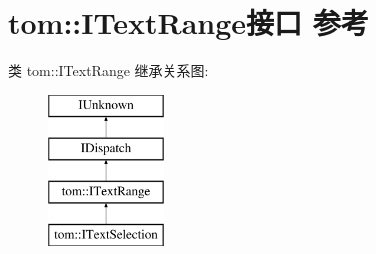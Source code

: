 \hypertarget{interfacetom_1_1_i_text_range}{}\section{tom\+:\+:I\+Text\+Range接口 参考}
\label{interfacetom_1_1_i_text_range}
类 tom\+:\+:I\+Text\+Range 继承关系图\+:\begin{figure}[H]
\begin{center}
\leavevmode
\includegraphics[height=4.000000cm]{interfacetom_1_1_i_text_range}
\end{center}
\end{figure}
